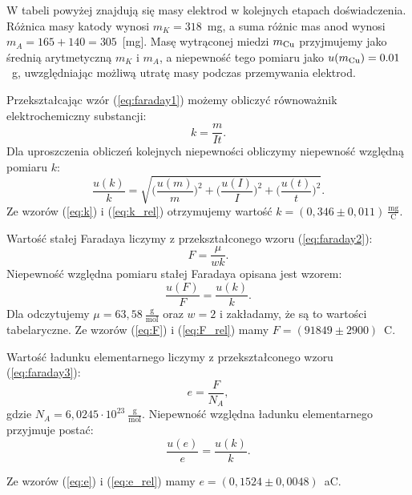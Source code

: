 \documentclass[12pt,a4paper]{article}
\numberwithin{equation}{section}
\begin{document}
W tabeli powyżej znajdują się masy elektrod w kolejnych etapach doświadczenia. Różnica masy katody wynosi $m_K = 318$~mg, a suma różnic mas anod wynosi $m_A = 165 + 140 = 305$~[mg]. Masę wytrąconej miedzi $m_{\ce{Cu}}$ przyjmujemy jako średnią arytmetyczną $m_K$ i $m_A$, a niepewność tego pomiaru jako $u(m_{\ce{Cu}}) = 0.01$~g, uwzględniając możliwą utratę masy podczas przemywania elektrod.

Przekształcając wzór (\ref{eq:faraday1}) możemy obliczyć równoważnik elektrochemiczny substancji:
\begin{equation}
	k = \frac{m}{It}.
	\label{eq:k}
\end{equation}
Dla uproszczenia obliczeń kolejnych niepewności obliczymy niepewność względną pomiaru $k$:
\begin{equation}
	\frac{u(k)}{k} = \sqrt{\Bigg(\frac{u(m)}{m}\Bigg)^2 + \Bigg(\frac{u(I)}{I}\Bigg)^2 + \Bigg(\frac{u(t)}{t}\Bigg)^2}.
	\label{eq:k_rel}
\end{equation}
Ze wzorów (\ref{eq:k}) i (\ref{eq:k_rel}) otrzymujemy wartość $k = (0,346 \pm 0,011)~\frac{\textrm{mg}}{\textrm{C}}$.

Wartość stałej Faradaya liczymy z przekształconego wzoru (\ref{eq:faraday2}):
\begin{equation}
	F = \frac{\mu}{wk}.
	\label{eq:F}
\end{equation}
Niepewność względna pomiaru stałej Faradaya opisana jest wzorem:
\begin{equation}
	\frac{u(F)}{F} = \frac{u(k)}{k}.
	\label{eq:F_rel}
\end{equation}
Dla  odczytujemy $\mu = 63,58~\frac{\textrm{g}}{\textrm{mol}}$ oraz $w = 2$ i zakładamy, że  są to wartości tabelaryczne. Ze wzorów (\ref{eq:F}) i (\ref{eq:F_rel}) mamy $F = (91849 \pm 2900)$~C.

Wartość ładunku elementarnego liczymy z przekształconego wzoru (\ref{eq:faraday3}):
\begin{equation}
	e = \frac{F}{N_A},
	\label{eq:e}
\end{equation}
gdzie $N_A = 6,0245 \cdot 10^{23}~\frac{\textrm{g}}{\textrm{mol}}$.
Niepewność względna ładunku elementarnego przyjmuje postać:
\begin{equation}
	\frac{u(e)}{e} = \frac{u(k)}{k}.
	\label{eq:e_rel}
\end{equation}

Ze wzorów (\ref{eq:e}) i (\ref{eq:e_rel}) mamy $e = (0,1524 \pm 0,0048)$~aC.
\end{document}
